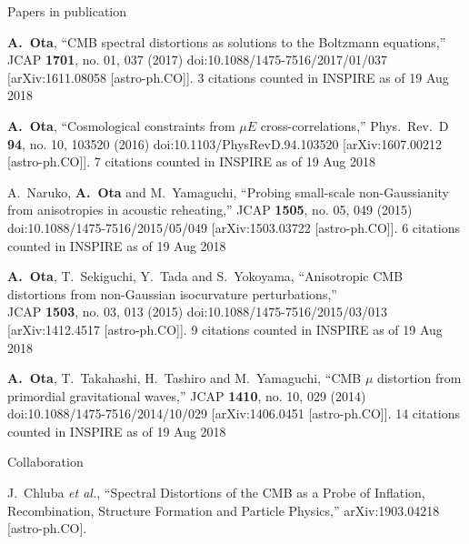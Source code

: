 \documentclass[a4paper]{resume} %
\begin{document}
\begin{rSection}{Papers in publication}
\begin{etaremune}
    \item
  {\bf A.~Ota},
  ``CMB spectral distortions as solutions to the Boltzmann equations,''
  JCAP {\bf 1701}, no. 01, 037 (2017)
  doi:10.1088/1475-7516/2017/01/037
  [arXiv:1611.08058 [astro-ph.CO]].
  3 citations counted in INSPIRE as of 19 Aug 2018
  
    \item
  {\bf A.~Ota},
  ``Cosmological constraints from $\mu E$ cross-correlations,''
  Phys.\ Rev.\ D {\bf 94}, no. 10, 103520 (2016)
  doi:10.1103/PhysRevD.94.103520
  [arXiv:1607.00212 [astro-ph.CO]].
  7 citations counted in INSPIRE as of 19 Aug 2018

  \item
    A.~Naruko, {\bf A.~Ota} and M.~Yamaguchi,
  ``Probing small-scale non-Gaussianity from anisotropies in acoustic reheating,''
  JCAP {\bf 1505}, no. 05, 049 (2015)
  doi:10.1088/1475-7516/2015/05/049
  [arXiv:1503.03722 [astro-ph.CO]].
  6 citations counted in INSPIRE as of 19 Aug 2018
  
    \item
  {\bf A.~Ota}, T.~Sekiguchi, Y.~Tada and S.~Yokoyama,
  ``Anisotropic CMB distortions from non-Gaussian isocurvature perturbations,''\\
  JCAP {\bf 1503}, no. 03, 013 (2015)
  doi:10.1088/1475-7516/2015/03/013
  [arXiv:1412.4517 [astro-ph.CO]].
  9 citations counted in INSPIRE as of 19 Aug 2018
  
    \item 
      {\bf A.~Ota}, T.~Takahashi, H.~Tashiro and M.~Yamaguchi,
  ``CMB $\mu$ distortion from primordial gravitational waves,''
  JCAP {\bf 1410}, no. 10, 029 (2014)
  doi:10.1088/1475-7516/2014/10/029
  [arXiv:1406.0451 [astro-ph.CO]].
  14 citations counted in INSPIRE as of 19 Aug 2018
    
\end{etaremune}

\newpage
\end{rSection}


\begin{rSection}{Collaboration}


\begin{etaremune}
\item%
  J.~Chluba {\it et al.},
  ``Spectral Distortions of the CMB as a Probe of Inflation, Recombination, Structure Formation and Particle Physics,''
  arXiv:1903.04218 [astro-ph.CO].
\end{etaremune}






\end{rSection}
\end{document}
